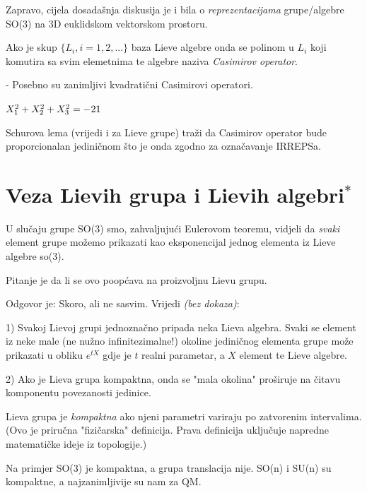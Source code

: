 Zapravo, cijela dosadašnja diskusija je i bila o 
\emph{reprezentacijama} grupe/algebre  SO(3) na 3D euklidskom 
vektorskom prostoru.

\begin{definicija}
Ako je skup $\{L_i, i=1,2, ... \}$ baza Lieve algebre onda se polinom
u $L_i$ koji komutira sa svim elemetnima te algebre naziva 
\emph{Casimirov operator}.
\end{definicija}

- Posebno su zanimljivi kvadratični Casimirovi operatori.

\begin{primjer}
$X_{1}^2 + X_{2}^2 + X_{3}^2 = -2 1 $

Schurova lema (vrijedi i za Lieve grupe) traži da Casimirov operator 
bude proporcionalan jediničnom što je onda zgodno za označavanje IRREPSa.
\end{primjer}

\section{Veza Lievih grupa i Lievih algebri$^*$}

U slučaju grupe SO(3) smo, zahvaljujući Eulerovom teoremu, vidjeli da
\emph{svaki} element grupe možemo prikazati kao eksponencijal jednog
elementa iz Lieve algebre so(3).

Pitanje je da li se ovo poopćava na proizvoljnu Lievu grupu.

Odgovor je: Skoro, ali ne sasvim. Vrijedi \emph{(bez dokaza)}:

1) Svakoj Lievoj grupi jednoznačno pripada neka Lieva algebra. Svaki 
  se element iz neke male (ne nužno infinitezimalne!) okoline 
  jediničnog elementa grupe može
  prikazati u obliku $e^{t X}$ gdje je $t$ realni parametar, a $X$ element
  te Lieve algebre.

2) Ako je Lieva grupa kompaktna, onda se "mala okolina" proširuje na
   čitavu komponentu povezanosti jedinice.

\begin{definicija}[Kompaktnost]
Lieva grupa je \emph{kompaktna} ako njeni parametri variraju po zatvorenim intervalima.
(Ovo je priručna "fizičarska" definicija. Prava definicija uključuje napredne
matematičke ideje iz topologije.)
\label{def:kompaktnost}
\end{definicija}

Na primjer SO(3) je kompaktna, a grupa translacija nije. SO(n) i SU(n) su
 kompaktne, a najzanimljivije su nam za QM.


